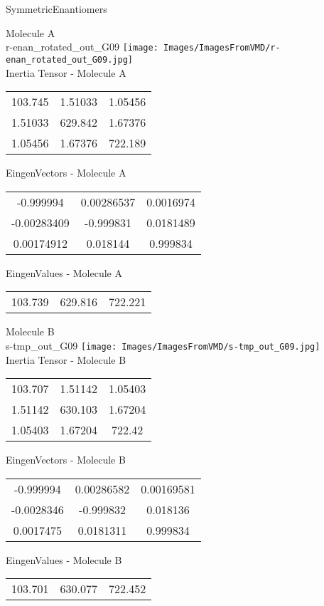 \vtab[-2cm]
\begin{center}
{\large SymmetricEnantiomers}
\end{center}
\begin{multicols}{2}
\begin{center}
Molecule A \\ 
r-enan\_rotated\_out\_G09
\texttt{[image: Images/ImagesFromVMD/r-enan\_rotated\_out\_G09.jpg]}
\\
Inertia Tensor - Molecule A \\
\vtab
\begin{tabular}{|c c c|}
103.745	 & 	1.51033	 & 	1.05456	 \\
1.51033	 & 	629.842	 & 	1.67376	 \\
1.05456	 & 	1.67376	 & 	722.189
\end{tabular}

\vtab
 EingenVectors - Molecule A     \\
\vtab
\begin{tabular}{|c c c|}
-0.999994	 & 	0.00286537	 & 	0.0016974	 \\
-0.00283409	 & 	-0.999831	 & 	0.0181489	 \\
0.00174912	 & 	0.018144	 & 	0.999834
\end{tabular}

\vtab
 EingenValues - Molecule A     \\
\vtab
\begin{tabular}{|c c c|}
103.739	 & 	629.816	 & 	722.221
\end{tabular}
\columnbreak

Molecule B \\ 
s-tmp\_out\_G09
\texttt{[image: Images/ImagesFromVMD/s-tmp\_out\_G09.jpg]}
\\
Inertia Tensor - Molecule B \\
\vtab
\begin{tabular}{|c c c|}
103.707	 & 	1.51142	 & 	1.05403	 \\
1.51142	 & 	630.103	 & 	1.67204	 \\
1.05403	 & 	1.67204	 & 	722.42
\end{tabular}

\vtab
 EingenVectors - Molecule B     \\
\vtab
\begin{tabular}{|c c c|}
-0.999994	 & 	0.00286582	 & 	0.00169581	 \\
-0.0028346	 & 	-0.999832	 & 	0.018136	 \\
0.0017475	 & 	0.0181311	 & 	0.999834
\end{tabular}

\vtab
 EingenValues - Molecule B     \\
\vtab
\begin{tabular}{|c c c|}
103.701	 & 	630.077	 & 	722.452
\end{tabular}

\end{center}
\end{multicols}
